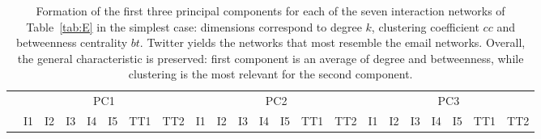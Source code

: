 \documentclass[%
 aip,
 jmp,%
 amsmath,amssymb,
 reprint,%
 floatfix,
]{revtex4-1}
\begin{document}
\begin{table}[!h]
	\caption{Formation of the first three principal components for each of the seven interaction networks of Table~\ref{tab:E} in the simplest case: dimensions correspond to degree $k$, clustering coefficient $cc$ and betweenness centrality $bt$. Twitter yields the networks that most resemble the email networks. Overall, the general characteristic is preserved: first component is an average of degree and betweenness, while clustering is the most relevant for the second component.}
	\footnotesize
	\begin{center}
		\begin{tabular}{| l ||  c |c |c |c |c | c | c || c | c | c | c | c | c | c || c |c |c |c |c | c | c |	}\cline{2-22}
			\multicolumn{1}{c|}{} & \multicolumn{7}{c||}{PC1}          & \multicolumn{7}{c||}{PC2} & \multicolumn{7}{c|}{PC3}  \\\cline{2-22}
			\multicolumn{1}{c|}{} & 
			I1 & I2 & I3 & I4 & I5 & TT1 & TT2 &
			I1 & I2 & I3 & I4 & I5 & TT1 & TT2 &
			I1 & I2 & I3 & I4 & I5 & TT1 & TT2 \\\hline
			
			\hline
		\end{tabular}
	\end{center}
	\label{tab:pcaE1I}
\end{table}
\end{document}
